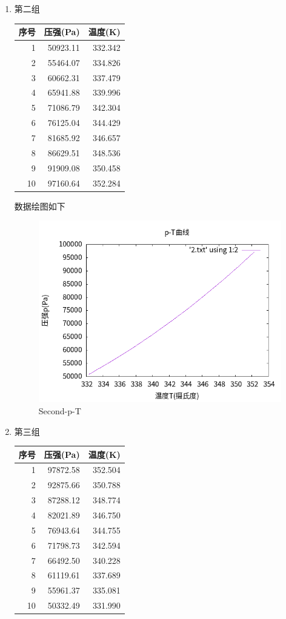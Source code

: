 \documentclass[11pt]{report}
\begin{document}
\begin{enumerate}
\item 第二组
\label{sec:org51ed222}
\begin{center}
\begin{tabular}{rrr}
序号 & 压强(Pa) & 温度(K)\\
\hline
1 & 50923.11 & 332.342\\
2 & 55464.07 & 334.826\\
3 & 60662.31 & 337.479\\
4 & 65941.88 & 339.996\\
5 & 71086.79 & 342.304\\
6 & 76125.04 & 344.429\\
7 & 81685.92 & 346.657\\
8 & 86629.51 & 348.536\\
9 & 91909.08 & 350.458\\
10 & 97160.64 & 352.284\\
\end{tabular}
\end{center}

数据绘图如下
\begin{figure}[htbp]
\centering
\includegraphics[width=.9\linewidth]{../data/2.png}
\caption{Second-p-T}
\end{figure}

\item 第三组
\label{sec:org42f22fb}
\begin{center}
\begin{tabular}{rrr}
序号 & 压强(Pa) & 温度(K)\\
\hline
1 & 97872.58 & 352.504\\
2 & 92875.66 & 350.788\\
3 & 87288.12 & 348.774\\
4 & 82021.89 & 346.750\\
5 & 76943.64 & 344.755\\
6 & 71798.73 & 342.594\\
7 & 66492.50 & 340.228\\
8 & 61119.61 & 337.689\\
9 & 55961.37 & 335.081\\
10 & 50332.49 & 331.990\\
\end{tabular}
\end{center}


\end{enumerate}
\end{document}
